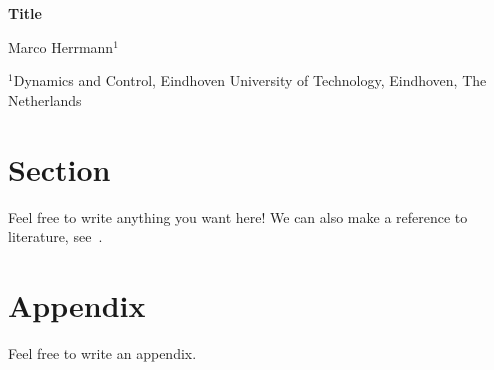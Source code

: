 \documentclass[a4paper,10pt,english]{article}
\begin{document}
	
\begin{center}
	\textbf{\large Title}
	
	\qquad
	
	Marco Herrmann$^1$
	
	\qquad
	
	$^{1}$Dynamics and Control, Eindhoven University of Technology, Eindhoven, The Netherlands
	
\end{center}


\section{Section}

Feel free to write anything you want here!
We can also make a reference to literature, see~\cite{Eugster2023a}.


\appendix

\section{Appendix}

Feel free to write an appendix.






\end{document}
